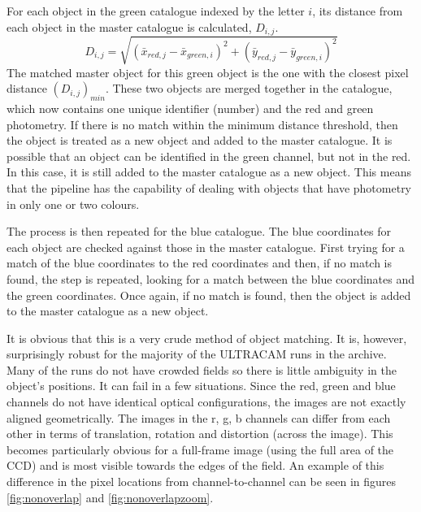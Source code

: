 For each object in the green catalogue indexed by the letter $i$, its distance from each object in the master catalogue is calculated, $D_{i,j}$. 
\begin{equation}D_{i,j} = \sqrt{(\bar{x}_{red, j}-\bar{x}_{green, i})^2 + (\bar{y}_{red, j}-\bar{y}_{green, i})^2}\end{equation} 
The matched master object for this green object is the one with the closest pixel distance $(D_{i,j})_{min}$. These two objects are merged together in the catalogue, which now contains one unique identifier (number) and the red and green photometry. If there is no match within the minimum distance threshold, then the object is treated as a new object and added to the master catalogue. It is possible that an object can be identified in the green channel, but not in the red. In this case, it is still added to the master catalogue as a new object. This means that the pipeline has the capability of dealing with objects that have photometry in only one or two colours. 

The process is then repeated for the blue catalogue. The blue coordinates for each object are checked against those in the master catalogue. First trying for a match of the blue coordinates to the red coordinates and then, if no match is found, the step is repeated, looking for a match between the blue coordinates and the green coordinates. Once again, if no match is found, then the object is added to the master catalogue as a new object.  

It is obvious that this is a very crude method of object matching. It is, however, surprisingly robust for the majority of the ULTRACAM runs in the archive. Many of the runs do not have crowded fields so there is little ambiguity in the object's positions. It can fail in a few situations. Since the red, green and blue channels do not have identical optical configurations, the images are not exactly aligned geometrically. The images in the r, g, b channels can differ from each other in terms of translation, rotation and distortion (across the image). This becomes particularly obvious for a full-frame image (using the full area of the CCD) and is most visible towards the edges of the field. An example of this difference in the pixel locations from channel-to-channel can be seen in figures \ref{fig:nonoverlap} and \ref{fig:nonoverlapzoom}.

